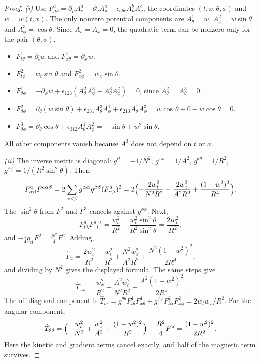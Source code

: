 \begin{proof}
\emph{(i)} Use $F^a_{\mu\nu}=\partial_\mu A^a_\nu-\partial_\nu A^a_\mu+\epsilon_{abc}A^b_\mu A^c_\nu$, the coordinates $(t,x,\theta,\phi)$ and $w=w(t,x)$. The only nonzero potential components are $A^1_\theta=w$, $A^2_\phi=w\sin\theta$ and $A^3_\phi=\cos\theta$. Since $A_t=A_x=0$, the quadratic term can be nonzero only for the pair $(\theta,\phi)$.
\begin{itemize}[nosep]
\item $F^1_{t\theta}=\partial_tw$ and $F^1_{x\theta}=\partial_xw$.
\item $F^2_{t\phi}=w_t\sin\theta$ and $F^2_{x\phi}=w_x\sin\theta$.
\item $F^1_{\theta\phi}=-\partial_\phi w+\epsilon_{123}(A^2_\theta A^3_\phi-A^3_\theta A^2_\phi)=0$, since $A^2_\theta=A^3_\theta=0$.
\item $F^2_{\theta\phi}=\partial_\theta(w\sin\theta)+\epsilon_{231}A^3_\theta A^1_\phi+\epsilon_{213}A^1_\theta A^3_\phi=w\cos\theta+0-w\cos\theta=0$.
\item $F^3_{\theta\phi}=\partial_\theta\cos\theta+\epsilon_{312}A^1_\theta A^2_\phi=-\sin\theta+w^2\sin\theta$.
\end{itemize}
All other components vanish because $A^3$ does not depend on $t$ or $x$.

\emph{(ii)} The inverse metric is diagonal: $g^{tt}=-1/N^2$, $g^{xx}=1/A^2$, $g^{\theta\theta}=1/R^2$, $g^{\phi\phi}=1/(R^2\sin^2\theta)$. Then
\[
F^a_{\alpha\beta}F^{a\alpha\beta}=2\sum_{\alpha<\beta}g^{\alpha\alpha}g^{\beta\beta}(F^a_{\alpha\beta})^2
=2\Bigl(-\frac{2w_t^2}{N^2R^2}+\frac{2w_x^2}{A^2R^2}+\frac{(1-w^2)^2}{R^4}\Bigr).
\]
The $\sin^2\theta$ from $F^2$ and $F^3$ cancels against $g^{\phi\phi}$. Next,
\[
F^a_{t\lambda}F^{a}{}_t{}^\lambda=\frac{w_t^2}{R^2}+\frac{w_t^2\sin^2\theta}{R^2\sin^2\theta}=\frac{2w_t^2}{R^2},
\]
and $-\frac14g_{tt}F^2=\frac{N^2}4F^2$. Adding,
\[
\hat T_{tt}=\frac{2w_t^2}{R^2}-\frac{w_t^2}{R^2}+\frac{N^2w_x^2}{A^2R^2}+\frac{N^2(1-w^2)^2}{2R^4},
\]
and dividing by $N^2$ gives the displayed formula. The same steps give
\[
\hat T_{xx}=\frac{w_x^2}{R^2}+\frac{A^2w_t^2}{N^2R^2}-\frac{A^2(1-w^2)^2}{2R^4}.
\]
The off-diagonal component is $\hat T_{tx}=g^{\theta\theta}F^1_{t\theta}F^1_{x\theta}+g^{\phi\phi}F^2_{t\phi}F^2_{x\phi}=2w_tw_x/R^2$. For the angular component,
\[
\hat T_{\theta\theta}=\Bigl(-\frac{w_t^2}{N^2}+\frac{w_x^2}{A^2}+\frac{(1-w^2)^2}{R^2}\Bigr)-\frac{R^2}4F^2=\frac{(1-w^2)^2}{2R^2}.
\]
Here the kinetic and gradient terms cancel exactly, and half of the magnetic term survives.


\end{proof}
